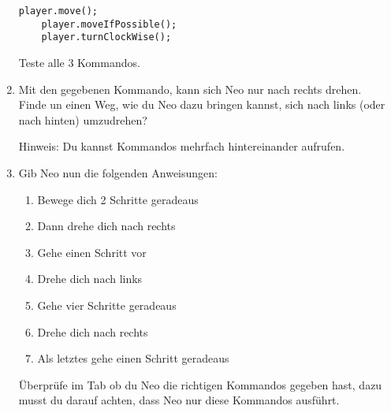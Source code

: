 \begin{enumerate}
        \begin{lstlisting}[firstnumber=20]
    player.move();
    player.moveIfPossible();
    player.turnClockWise();
        \end{lstlisting}

        Teste alle 3 Kommandos.\\
    \item Mit den gegebenen Kommando, kann sich Neo nur nach rechts drehen.\\
        Finde un einen Weg, wie du Neo dazu bringen kannst, sich nach links (oder nach hinten) umzudrehen?

        Hinweis: Du kannst Kommandos mehrfach hintereinander aufrufen.
    \item Gib Neo nun die folgenden Anweisungen:
        
        {
            \begin{enumerate}
                \item Bewege dich 2 Schritte geradeaus
                \item Dann drehe dich nach rechts
                \item Gehe einen Schritt vor
                \item Drehe dich nach links
                \item Gehe vier Schritte geradeaus
                \item Drehe dich nach rechts
                \item Als letztes gehe einen Schritt geradeaus
            \end{enumerate}
        }

        Überprüfe im  Tab ob du Neo die richtigen Kommandos gegeben hast, dazu musst du darauf achten, dass Neo nur diese Kommandos ausführt.
\end{enumerate}

